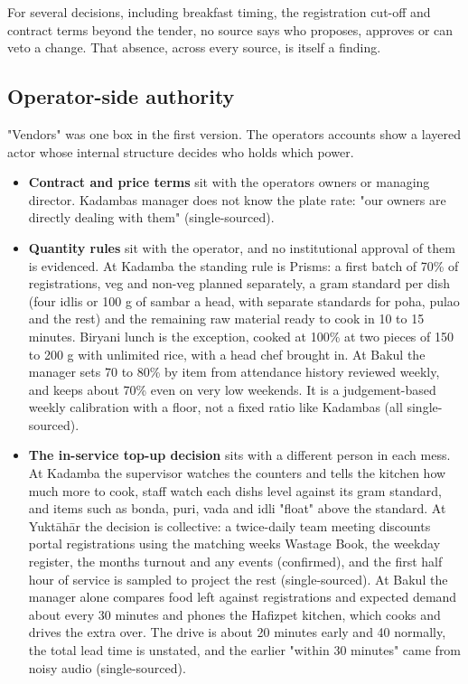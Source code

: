 \documentclass[
  10pt,
  table]{article}
\providecommand{\tightlist}{%
  \setlength{\itemsep}{0pt}\setlength{\parskip}{0pt}}
\renewcommand{\tightlist}{\setlength{\itemsep}{1.5pt}\setlength{\parskip}{0pt}}
\begin{document}
For several decisions, including breakfast timing, the registration cut-off and contract terms beyond the tender, no source says who proposes, approves or can veto a change. That absence, across every source, is itself a finding.

\subsection{Operator-side authority}\label{operator-side-authority}

"Vendors" was one box in the first version. The operators\textquotesingle{} accounts show a layered actor whose internal structure decides who holds which power.

\begin{itemize}
\tightlist
\item
  \textbf{Contract and price terms} sit with the operator\textquotesingle s owners or managing director. Kadamba\textquotesingle s manager does not know the plate rate: "our owners are directly dealing with them" (single-sourced).
\item
  \textbf{Quantity rules} sit with the operator, and no institutional approval of them is evidenced. At Kadamba the standing rule is Prism\textquotesingle s: a first batch of 70\% of registrations, veg and non-veg planned separately, a gram standard per dish (four idlis or 100 g of sambar a head, with separate standards for poha, pulao and the rest) and the remaining raw material ready to cook in 10 to 15 minutes. Biryani lunch is the exception, cooked at 100\% at two pieces of 150 to 200 g with unlimited rice, with a head chef brought in. At Bakul the manager sets 70 to 80\% by item from attendance history reviewed weekly, and keeps about 70\% even on very low weekends. It is a judgement-based weekly calibration with a floor, not a fixed ratio like Kadamba\textquotesingle s (all single-sourced).
\item
  \textbf{The in-service top-up decision} sits with a different person in each mess. At Kadamba the supervisor watches the counters and tells the kitchen how much more to cook, staff watch each dish\textquotesingle s level against its gram standard, and items such as bonda, puri, vada and idli "float" above the standard. At Yuktāhār the decision is collective: a twice-daily team meeting discounts portal registrations using the matching week\textquotesingle s Wastage Book, the weekday register, the month\textquotesingle s turnout and any events (confirmed), and the first half hour of service is sampled to project the rest (single-sourced). At Bakul the manager alone compares food left against registrations and expected demand about every 30 minutes and phones the Hafizpet kitchen, which cooks and drives the extra over. The drive is about 20 minutes early and 40 normally, the total lead time is unstated, and the earlier "within 30 minutes" came from noisy audio (single-sourced).

\end{itemize}
\end{document}
